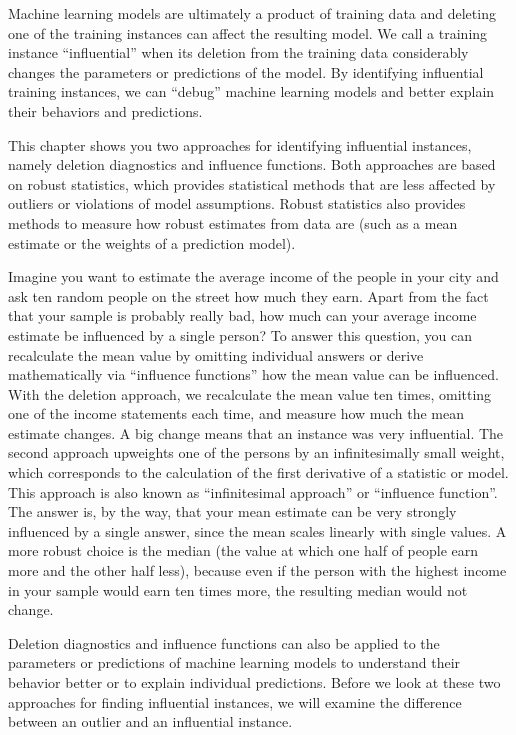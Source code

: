 \documentclass[
  12pt,
]{krantz}
\begin{document}
Machine learning models are ultimately a product of training data and deleting one of the training instances can affect the resulting model.
We call a training instance ``influential'' when its deletion from the training data considerably changes the parameters or predictions of the model.
By identifying influential training instances, we can ``debug'' machine learning models and better explain their behaviors and predictions.

This chapter shows you two approaches for identifying influential instances, namely deletion diagnostics and influence functions.
Both approaches are based on robust statistics, which provides statistical methods that are less affected by outliers or violations of model assumptions.
Robust statistics also provides methods to measure how robust estimates from data are (such as a mean estimate or the weights of a prediction model).

Imagine you want to estimate the average income of the people in your city and ask ten random people on the street how much they earn.
Apart from the fact that your sample is probably really bad, how much can your average income estimate be influenced by a single person?
To answer this question, you can recalculate the mean value by omitting individual answers or derive mathematically via ``influence functions'' how the mean value can be influenced.
With the deletion approach, we recalculate the mean value ten times, omitting one of the income statements each time, and measure how much the mean estimate changes.
A big change means that an instance was very influential.
The second approach upweights one of the persons by an infinitesimally small weight, which corresponds to the calculation of the first derivative of a statistic or model.
This approach is also known as ``infinitesimal approach'' or ``influence function''.
The answer is, by the way, that your mean estimate can be very strongly influenced by a single answer, since the mean scales linearly with single values.
A more robust choice is the median (the value at which one half of people earn more and the other half less), because even if the person with the highest income in your sample would earn ten times more, the resulting median would not change.

Deletion diagnostics and influence functions can also be applied to the parameters or predictions of machine learning models to understand their behavior better or to explain individual predictions.
Before we look at these two approaches for finding influential instances, we will examine the difference between an outlier and an influential instance.
\end{document}
